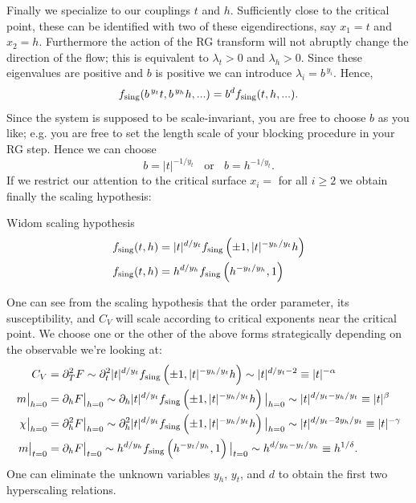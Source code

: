 Finally we specialize to our couplings $t$ and $h$. Sufficiently close to the
critical point, these can be identified with two of these eigendirections, say
$x_1=t$ and $x_2=h$. Furthermore the action of the RG transform will not abruptly
change the direction of the flow; this is equivalent to $\lambda_t>0$ and
$\lambda_h>0$. Since these eigenvalues are positive and $b$ is positive we
can introduce $\lambda_i=b^{\,y_i}$. Hence,
\begin{equation}
  f_{\text{sing}}(b^{\,y_t}t,b^{\,y_h}h,...)=b^df_{\text{sing}}(t,h,...).
\end{equation}
Since the system is supposed to be scale-invariant, you are free to choose $b$
as you like; e.g. you are free to set the length scale of your blocking
procedure in your RG step. Hence we can choose
\begin{equation}
  b=|t|^{-1/y_t}~~~~\text{or}~~~~b=h^{-1/y_t}.
\end{equation} 
If we restrict our attention to the critical surface $x_i=$ for all $i\geq2$
we obtain finally the scaling hypothesis:
\begin{theorem}{Widom scaling hypothesis}{}
  \begin{equation*}\begin{aligned}
    f_{\text{sing}}(t,h)&=|t|^{d/y_t}f_{\text{sing}}\left(\pm1,|t|^{-y_h/y_t}h\right)\\
    f_{\text{sing}}(t,h)&=h^{d/y_h}f_{\text{sing}}\left(h^{-y_t/y_h},1\right)
  \end{aligned}\end{equation*}
\end{theorem}

One can see from the scaling hypothesis that the order parameter, its
susceptibility, and $C_V$ will scale according to critical exponents
near the critical point. We choose one or the other of the above forms
strategically depending on the observable we're looking at:
\begin{equation}\begin{aligned}
  C_V&=\partial_T^2 F
     \sim\partial_t^2 |t|^{d/y_t}f_{\text{sing}}\left(\pm1,|t|^{-y_h/y_t}h\right)
     \sim|t|^{d/y_t-2}
     \equiv|t|^{-\alpha}\\
  m\big|_{h=0}&=\partial_h F\big|_{h=0}
     \sim\partial_h |t|^{d/y_t}f_{\text{sing}}\left(\pm1,|t|^{-y_h/y_t}h\right)\big|_{h=0}
     \sim|t|^{d/y_t-y_h/y_t}
     \equiv|t|^{\beta}\\
  \chi\big|_{h=0}&=\partial^2_h F\big|_{h=0}
     \sim\partial^2_h |t|^{d/y_t}f_{\text{sing}}\left(\pm1,|t|^{-y_h/y_t}h\right)\big|_{h=0}
     \sim|t|^{d/y_t-2y_h/y_t}
     \equiv|t|^{-\gamma}\\
  m\big|_{t=0}&=\partial_h F\big|_{t=0}
     \sim h^{d/y_h}f_{\text{sing}}\left(h^{-y_t/y_h},1\right)\big|_{t=0}
     \sim h^{d/y_h-y_t/y_h}
     \equiv h^{1/\delta}.
\end{aligned}\end{equation}
One can eliminate the unknown variables $y_h$, $y_t$, and $d$ to obtain
the first two hyperscaling relations.

